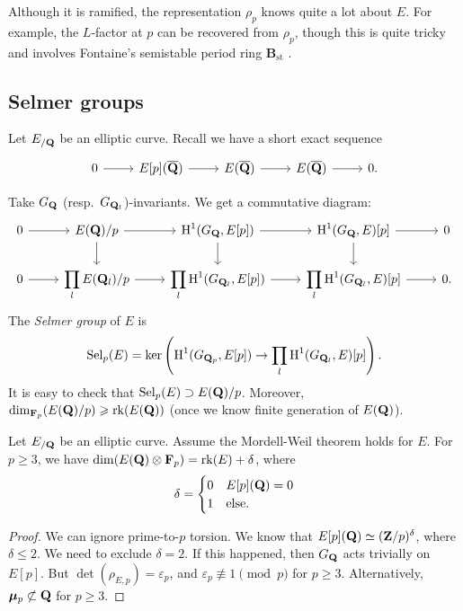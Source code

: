 Although it is ramified, the representation $\rho_p$ knows quite a lot about 
$E$. For example, the $L$-factor at $p$ can be recovered from $\rho_p$, though 
this is quite tricky and involves Fontaine's semistable period ring 
$\mathbf{B}_\mathrm{st}$ \cite{ochiai-1999}. 




\subsection{Selmer groups}

Let $E_{/\mathbf{Q}}$ be an elliptic curve. Recall we have a short exact sequence 
\[\begin{tikzcd}
  0 \ar[r] 
    & E[p](\overline\dQ) \ar[r] 
    & E(\overline\dQ) \ar[r] 
    & E(\overline\dQ) \ar[r] 
    & 0 .
\end{tikzcd}\]

Take $G_{\mathbf{Q}}$ (resp.~$G_{\mathbf{Q}_l}$)-invariants. We get a commutative 
diagram:  
\[\begin{tikzcd}
  0 \ar[r] 
    & E(\dQ)/p \ar[r] \ar[d] 
    & \h^1(G_\dQ,E[p]) \ar[r] \ar[d] 
    & \h^1(G_\dQ,E)[p] \ar[r] \ar[d] 
    & 0 \\ 
  0 \ar[r] 
    & \displaystyle\prod_l E(\dQ_l)/p \ar[r] 
    & \displaystyle\prod_l \h^1(G_{\dQ_l},E[p]) \ar[r] 
    & \displaystyle\prod_l \h^1(G_{\dQ_l},E)[p] \ar[r] 
    & 0 .
\end{tikzcd}\]
The \emph{Selmer group} of $E$ is 
\[
  \operatorname{Sel}_p(E) = \ker\left(\operatorname{H}^1(G_{\mathbf{Q}_p},E[p]) \to \prod_l \operatorname{H}^1(G_{\mathbf{Q}_l},E)[p]\right) .
\]
It is easy to check that $\operatorname{Sel}_p(E)\supset E(\mathbf{Q})/p$. Moreover, 
$\dim_{\mathbf{F}_p}(E(\mathbf{Q})/p) \geqslant \operatorname{rk}(E(\mathbf{Q}))$ (once we know finite 
generation of $E(\mathbf{Q})$). 

\begin{theorem}
Let $E_{/\mathbf{Q}}$ be an elliptic curve. Assume the Mordell-Weil theorem holds for 
$E$. For $p\geqslant 3$, we have $\dim(E(\mathbf{Q})\otimes\mathbf{F}_p) = \operatorname{rk}(E)+\delta$, 
where 
\[
  \delta = \begin{cases} 0 & E[p](\mathbf{Q}) = 0 \\ 1 & \text{else} .\end{cases}
\] 
\end{theorem}
\begin{proof}
We can ignore prime-to-$p$ torsion. We know that 
$E[p](\mathbf{Q})\simeq (\mathbf{Z}/p)^\delta$, where $\delta\leqslant 2$. We need to exclude 
$\delta=2$. If this happened, then $G_{\mathbf{Q}}$ acts trivially on $E[p]$. But 
$\det(\rho_{E,p})=\varepsilon_p$, and $\varepsilon_p\not\equiv 1\pmod p$ for 
$p\geqslant 3$. Alternatively, ${\bm\mu}_p\not\subset \mathbf{Q}$ for $p\geqslant 3$. 
\end{proof}

